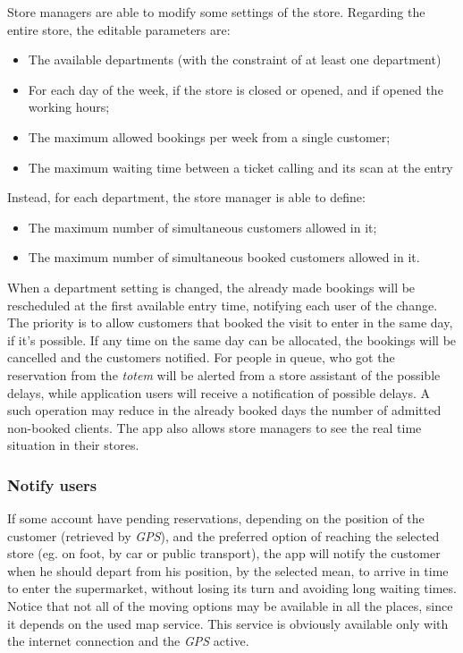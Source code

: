 \documentclass{article}
\begin{document}
		Store managers are able to modify some settings of the store. Regarding the entire store, the editable parameters are:
		\begin{itemize}
			\item The available departments (with the constraint of at least one department)
			\item For each day of the week, if the store is closed or opened, and if opened the working hours;
			\item The maximum allowed bookings per week from a single customer;
			\item The maximum waiting time between a ticket calling and its scan at the entry
		\end{itemize}
	
		Instead, for each department, the store manager is able to define:
		\begin{itemize}
			\item The maximum number of simultaneous customers allowed in it;
			\item The maximum number of simultaneous booked customers allowed in it.
		\end{itemize}
	 When a department setting is changed, the already made bookings will be rescheduled at the first available entry time, notifying each user of the change. The priority is to allow customers that booked the visit to enter in the same day, if it's possible. If any time on the same day can be allocated, the bookings will be cancelled and the customers notified. For people in queue, who got the reservation from the \emph{totem} will be alerted from a store assistant of the possible delays, while application users will receive a notification of possible delays. A such operation may reduce in the already booked days the number of admitted non-booked clients. 
	 The app also allows store managers to see the real time situation in their stores.
	
		\subsubsection{Notify users}
		
		If some account have pending reservations, depending on the position of the customer (retrieved by \emph{GPS}), and the preferred option of reaching the selected store (eg. on foot, by car or public transport), the app will notify the customer when he should depart from his position, by the selected mean, to arrive in time to enter the supermarket, without losing its turn and avoiding long waiting times. Notice that not all of the moving options may be available in all the places, since it depends on the used map service. This service is obviously available only with the internet connection and the \emph{GPS} active.
		
\end{document}
